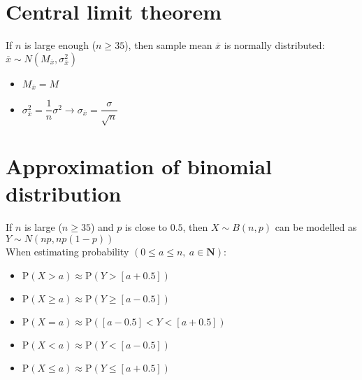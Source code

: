 \section{Central limit theorem}
If $n$ is large enough ($n\geq35$), then sample mean $\overline{x}$ is normally distributed: $\overline{x} \sim N(M_{\overline{x}}, \sigma_{\overline{x}}^2)$
\begin{itemize}
	\item $M_{\overline{x}}=M$
	\item $\sigma_{\overline{x}}^2=\dfrac{1}{n}\sigma^2 \rightarrow \sigma_{\overline{x}} = \dfrac{\sigma}{\sqrt{n}}$
\end{itemize}

\section{Approximation of binomial distribution}
If $n$ is large ($n\geq35$) and $p$ is close to $0.5$, then $X \sim B(n,p)$ can be modelled as $Y \sim N(np, np(1-p))$\\
When estimating probability $(0\leq a \leq n, \: a \in \textbf{N})$:
\begin{itemize}
	\item $\text{P}(X>a)\approx \text{P}(Y>[a+0.5])$
	\item $\text{P}(X\geq a)\approx \text{P}(Y\geq [a-0.5])$
	\item $\text{P}(X=a)\approx \text{P}([a-0.5]<Y<[a+0.5])$
	\item $\text{P}(X<a)\approx \text{P}(Y<[a-0.5])$
	\item $\text{P}(X \leq a)\approx \text{P}(Y\leq [a+0.5])$
\end{itemize}